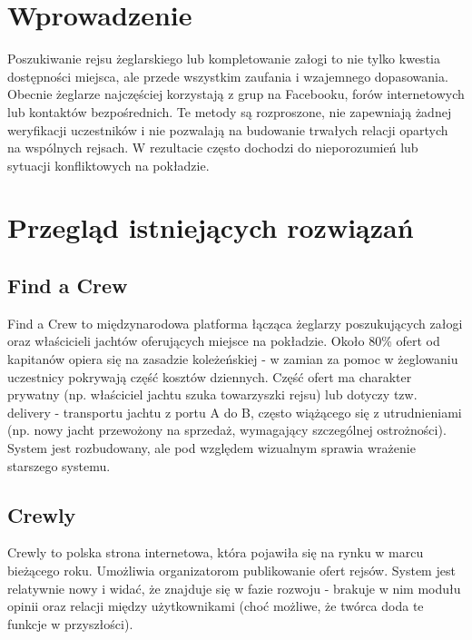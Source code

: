 \documentclass[shortabstract]{iithesis}
\author         {Antoni Tomaszewski}
\begin{document}

\chapter{Wprowadzenie}

Poszukiwanie rejsu żeglarskiego lub kompletowanie załogi to nie tylko kwestia dostępności miejsca, ale przede wszystkim zaufania i wzajemnego dopasowania. Obecnie żeglarze najczęściej korzystają z grup na Facebooku, forów internetowych lub kontaktów bezpośrednich. Te metody są rozproszone, nie zapewniają żadnej weryfikacji uczestników i nie pozwalają na budowanie trwałych relacji opartych na wspólnych rejsach. W rezultacie często dochodzi do nieporozumień lub sytuacji konfliktowych na pokładzie.

\chapter{Przegląd istniejących rozwiązań}
\section{Find a Crew}
Find a Crew \cite{findacrew} to międzynarodowa platforma łącząca żeglarzy poszukujących załogi oraz właścicieli jachtów oferujących miejsce na pokładzie. Około 80\% ofert od kapitanów opiera się na zasadzie koleżeńskiej - w zamian za pomoc w żeglowaniu uczestnicy pokrywają część kosztów dziennych. Część ofert ma charakter prywatny (np. właściciel jachtu szuka towarzyszki rejsu) lub dotyczy tzw. delivery - transportu jachtu z portu A do B, często wiążącego się z utrudnieniami (np. nowy jacht przewożony na sprzedaż, wymagający szczególnej ostrożności). System jest rozbudowany, ale pod względem wizualnym sprawia wrażenie starszego systemu.

\section{Crewly}
Crewly \cite{crewly} to polska strona internetowa, która pojawiła się na rynku w marcu bieżącego roku. Umożliwia organizatorom publikowanie ofert rejsów. System jest relatywnie nowy i widać, że znajduje się w fazie rozwoju - brakuje w nim modułu opinii oraz relacji między użytkownikami (choć możliwe, że twórca doda te funkcje w przyszłości).
\end{document}
